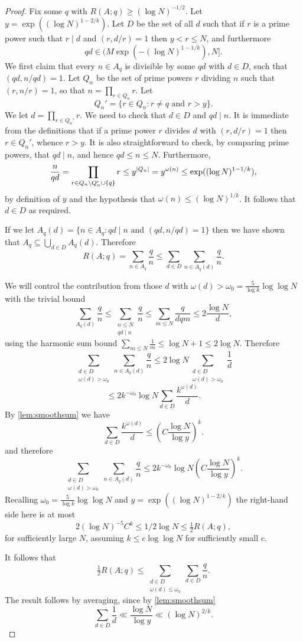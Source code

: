 \begin{proof}
Fix some $q$ with $R(A;q)\geq (\log N)^{-1/2}$. Let $y=\exp((\log N)^{1-2/k})$. Let $D$ be the set of all $d$ such that if $r$ is a prime power such that $r\mid d$ and $(r,d/r)=1$ then $y<r\leq N$, and furthermore 
\[qd\in (M\exp(-(\log N)^{1-1/k}),N].\]
We first claim that every $n\in A_q$ is divisible by some $qd$ with $d\in D$, such that $(qd,n/qd)=1$. Let $Q_n$ be the set of prime powers $r$ dividing $n$ such that $(r,n/r)=1$, so that $n=\prod_{r\in Q_n}r$. Let 
\[Q_n'=\{ r\in Q_n: r\neq q\textrm{ and }r>y\}.\]
We let $d=\prod_{r\in Q_n'}r$. We need to check that $d\in D$ and $qd\mid n$. It is immediate from the definitions that if a prime power $r$ divides $d$ with $(r,d/r)=1$ then $r\in Q_n'$, whence $r>y$. It is also straightforward to check, by comparing prime powers, that $qd\mid n$, and hence $qd\leq n\leq N$. Furthermore, 
\[\frac{n}{qd}=\prod_{r\in Q_n\backslash Q_n'\cup\{q\}}r\leq y^{\left\lvert Q_n\right\rvert}=y^{\omega(n)}\leq \exp((\log N)^{1-1/k}),\]
by definition of $y$ and the hypothesis that $\omega(n)\leq (\log N)^{1/k}$. It follows that $d\in D$ as required. 	

If we let $A_q(d)=\{ n \in A_q : qd\mid n\textrm{ and }(qd,n/qd)=1\}$ then we have shown that $A_q\subseteq \bigcup_{d\in D}A_q(d)$. Therefore
\[R(A;q) = \sum_{n\in A_q}\frac{q}{n}\leq \sum_{d\in D}\sum_{n\in A_q(d)}\frac{q}{n}.\]

We will control the contribution from those $d$ with $\omega(d)>\omega_0= \frac{5}{\log k}\log\log N$ with the trivial bound
\[\sum_{A_q(d)}\frac{q}{n} \leq \sum_{\substack{n\leq N\\ qd\mid n}}\frac{q}{n}\leq \sum_{m\leq N}\frac{q}{dqm}\leq 2\frac{\log N}{d},\]
using the harmonic sum bound $\sum_{m\leq N}\frac{1}{m}\leq \log N+1\leq 2\log N$. 
Therefore 
\[
\sum_{\substack{d\in D\\ \omega(d)>\omega_0}}\sum_{n\in A_q(d)}\frac{q}{n}
\leq 2\log N\sum_{\substack{d\in D\\ \omega(d)> \omega_0}} \frac{1}{d}\]
\[\leq 2k^{-\omega_0}\log N\sum_{d\in D} \frac{k^{\omega(d)}}{d}.\]
By \ref{lem:smoothsum} we have
\[\sum_{d\in D}\frac{k^{\omega(d)}}{d}\leq \left(C\frac{\log N}{\log y}\right)^k.\]
and therefore
\[\sum_{\substack{d\in D\\ \omega(d)>\omega_0}}\sum_{n\in A_q(d)}\frac{q}{n}\leq 2k^{-\omega_0}\log N \left(C\frac{\log N}{\log y}\right)^k.\]
Recalling $\omega_0=\frac{5}{\log k}\log\log N$ and  $y=\exp((\log N)^{1-2/k})$ the right-hand side here is at most 
\[2(\log N)^{-5}C^k\leq 1/2\log N\leq \tfrac{1}{2}R(A;q),\]
for sufficiently large $N$, assuming $k\leq c\log\log N$ for sufficiently small $c$.  

It follows that
\[\tfrac{1}{2}R(A;q)\leq \sum_{\substack{d\in D\\ \omega(d)\leq \omega_0}}\sum_{d\in D}\frac{q}{n} .\]
The result follows by averaging, since by \ref{lem:smoothsum}
\[\sum_{d\in D}\frac{1}{d} \ll \frac{\log N}{\log y}\ll (\log N)^{2/k}.\]
\end{proof}


